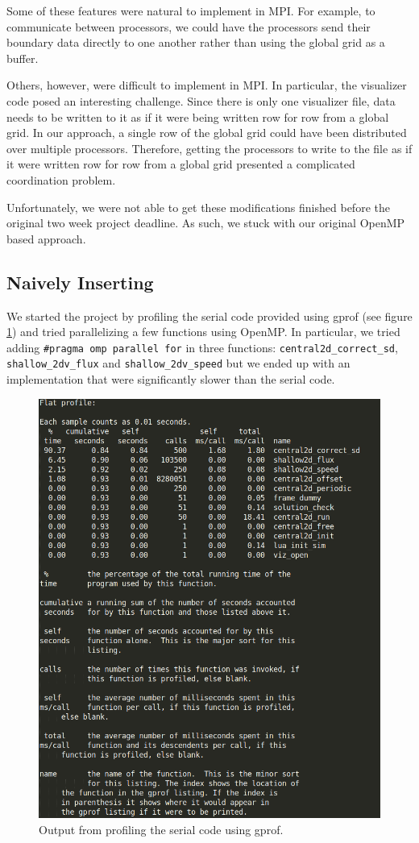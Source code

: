 \documentclass{article}
\begin{document}
Some of these features were natural to implement in MPI.
For example, to communicate between processors, we could have the processors send their boundary data directly to one another rather than using the global grid as a buffer.

Others, however, were difficult to implement in MPI.
In particular, the visualizer code posed an interesting challenge.
Since there is only one visualizer file, data needs to be written to it as if it were being written row for row from a global grid.
In our approach, a single row of the global grid could have been distributed over multiple processors.
Therefore, getting the processors to write to the file as if it were written row for row from a global grid presented a complicated coordination problem.

Unfortunately, we were not able to get these modifications finished before the original two week project deadline.
As such, we stuck with our original OpenMP based approach.

\subsection{Naively Inserting }

We started the project by profiling the serial code provided using gprof (see figure \ref{fig:gprof}) and tried parallelizing a few functions using OpenMP. 
In particular, we tried adding \texttt{\#pragma omp parallel for} in three functions: \texttt{central2d\_correct\_sd}, \texttt{shallow\_2dv\_flux} and \texttt{shallow\_2dv\_speed} 
but we ended up with an implementation that were significantly slower than the serial code.


\begin{figure}[h!]
	\centering
	\includegraphics[width=0.8\columnwidth]{../gprof_profile.png}
	\caption{Output from profiling the serial code using gprof.}
	\label{fig:gprof}
\end{figure}
\end{document}
